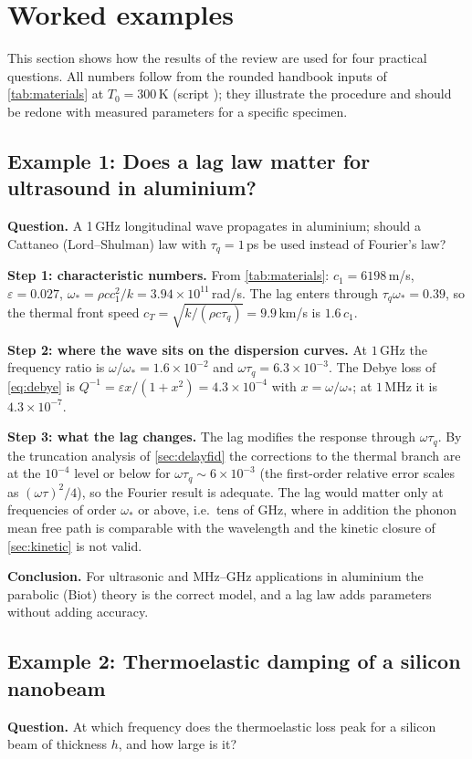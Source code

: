 \section{Worked examples}\label{sec:examples}

This section shows how the results of the review are used for four practical questions. All numbers follow from the rounded handbook inputs of \cref{tab:materials} at $T_0=300$\,K (script ); they illustrate the procedure and should be redone with measured parameters for a specific specimen.

\subsection{Example 1: Does a lag law matter for ultrasound in aluminium?}
\textbf{Question.} A 1\,GHz longitudinal wave propagates in aluminium; should a Cattaneo (Lord--Shulman) law with $\tau_q=1$\,ps be used instead of Fourier's law?

\textbf{Step 1: characteristic numbers.} From \cref{tab:materials}: $c_1=6198$\,m/s, $\varepsilon=0.027$, $\omega_*=\rho c c_1^2/k=3.94\times10^{11}$\,rad/s. The lag enters through $\tau_q\omega_*=0.39$, so the thermal front speed $c_T=\sqrt{k/(\rho c\tau_q)}=9.9$\,km/s is $1.6\,c_1$.

\textbf{Step 2: where the wave sits on the dispersion curves.} At $1$\,GHz the frequency ratio is $\omega/\omega_*=1.6\times10^{-2}$ and $\omega\tau_q=6.3\times10^{-3}$. The Debye loss of \cref{eq:debye} is $Q^{-1}=\varepsilon x/(1+x^2)=4.3\times10^{-4}$ with $x=\omega/\omega_*$; at $1$\,MHz it is $4.3\times10^{-7}$.

\textbf{Step 3: what the lag changes.} The lag modifies the response through $\omega\tau_q$. By the truncation analysis of \cref{sec:delayfid} the corrections to the thermal branch are at the $10^{-4}$ level or below for $\omega\tau_q\sim6\times10^{-3}$ (the first-order relative error scales as $(\omega\tau)^2/4$), so the Fourier result is adequate. The lag would matter only at frequencies of order $\omega_*$ or above, i.e.\ tens of GHz, where in addition the phonon mean free path is comparable with the wavelength and the kinetic closure of \cref{sec:kinetic} is not valid.

\textbf{Conclusion.} For ultrasonic and MHz--GHz applications in aluminium the parabolic (Biot) theory is the correct model, and a lag law adds parameters without adding accuracy.

\subsection{Example 2: Thermoelastic damping of a silicon nanobeam}
\textbf{Question.} At which frequency does the thermoelastic loss peak for a silicon beam of thickness $h$, and how large is it?

